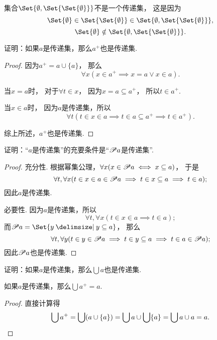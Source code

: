 \begin{example}
\def\a{\Set{\emptyset}}%
\def\b{\Set{\a}}%
\def\A{\Set{ \emptyset, \b }}%
集合\(\A\)不是一个传递集，%
这是因为\[
\a \in \b \in \A,
\]\[
\a \notin \A.
\]
\end{example}

\begin{example}
证明：如果\(a\)是传递集，那么\(a^+\)也是传递集.
\begin{proof}
因为\(a^+ = a \cup \{a\}\)，%
那么\[
\forall x( x \in a^+ \implies x = a \lor x \in a ).
\]

当\(x = a\)时，%
对于\(\forall t \in x\)，%
因为\(x = a \subseteq a^+\)，%
所以\(t \in a^+\).

当\(x \in a\)时，%
因为\(a\)是传递集，所以\[
\forall t
(
t \in x \in a
\implies t \in a \subseteq a^+
\implies t \in a^+
).
\]

综上所述，\(a^+\)也是传递集.
\end{proof}
\end{example}

\begin{example}
证明：“\(a\)是传递集”的充要条件是“\(\mathscr{P} a\)是传递集”.
\begin{proof}
充分性.
根据幂集公理，\(\forall x(x \in \mathscr{P} a \iff x \subseteq a)\)，%
于是\[
\forall t, \forall x
(t \in x \in a \in \mathscr{P} a
\implies t \in x \subseteq a
\implies t \in a);
\]因此\(a\)是传递集.

必要性.
因为\(a\)是传递集，所以\[
\forall t, \forall x
(t \in x \in a \implies t \in a);
\]
而\(\Powerset a = \Set{ y \given y \subseteq a }\)，%
那么\[
\forall t, \forall y
(t \in y \in \mathscr{P} a
\implies t \in y \subseteq a
\implies t \in a \in \mathscr{P} a);
\]
因此\(\mathscr{P} a\)也是传递集.
\end{proof}
\end{example}

\begin{example}
证明：如果\(a\)是传递集，那么\(\bigcup a\)也是传递集.
\end{example}

\begin{theorem}
如果\(a\)是传递集，那么\(\bigcup a^+ = a\).
\begin{proof}
直接计算得\[
\bigcup a^+
= \bigcup (a \cup \{a\})
= \bigcup a \cup \bigcup\{a\}
= \bigcup a \cup a
= a.
\qedhere
\]
\end{proof}
\end{theorem}

